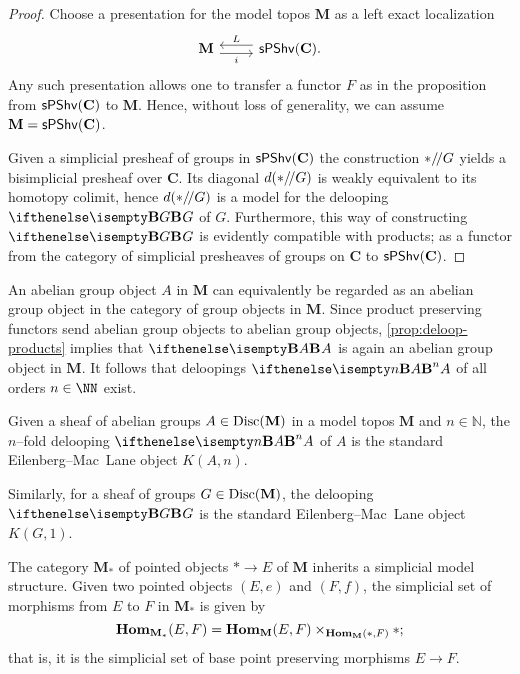 \begin{proof}
  Choose a presentation for the model topos \(\mathbf M\) as a left exact
  localization
  \[
    \begin{tikzcd}
      \mathbf M \arrow[r, shift right=.7ex, "i"'] & \arrow[l, shift right=.7ex,
      "L"'] \spshv(\mathbf C).
    \end{tikzcd}
  \]
  Any such presentation allows one to transfer a functor \(F\) as in the
  proposition from \(\operatorname{\textnormal{\textsf{sPShv}}}(\mathbf C)\) to \(\mathbf M\). Hence, without loss
  of generality, we can assume \(\mathbf M = \operatorname{\textnormal{\textsf{sPShv}}}(\mathbf C)\).

  Given a simplicial presheaf of groups in \(\operatorname{\textnormal{\textsf{sPShv}}}(\mathbf C)\) the
  construction \(*/\!/G\) yields a bisimplicial presheaf over \(\mathbf
  C\). Its diagonal \(d(*/\!/G)\) is weakly equivalent to its homotopy
  colimit, hence \(d(*/\!/G)\) is a model
  for the delooping \(\deloop{G}\) of \(G\). Furthermore, this way of
  constructing \(\deloop{G}\) is evidently compatible with products; as a functor from the category of simplicial presheaves
  of groups on \(\mathbf C\) to \(\operatorname{\textnormal{\textsf{sPShv}}}(\mathbf C)\).
\end{proof}

An abelian group object \(A\) in \(\mathbf M\) can equivalently be regarded as
an abelian group object in the category of group objects in \(\mathbf M\). Since
product preserving functors send abelian group objects to abelian group objects,
\autoref{prop:deloop-products} implies that \(\deloop{A}\) is again an abelian
group object in \(\mathbf M\). It follows that deloopings \(\deloop[n]{A}\) of
all orders \(n\in\NN\) exist.

\begin{definition}
  Given a sheaf of abelian groups \(A\in\operatorname{\textnormal{Disc}}(\mathbf M)\) in a model topos
  \(\mathbf M\) and \(n\in\mathbb N\), the \(n\)--fold delooping
  \(\deloop[n]{A}\) of \(A\) is the standard Eilenberg--Mac~Lane object
  \(K(A,n)\).

  Similarly, for a sheaf of groups \(G\in\operatorname{\textnormal{Disc}}(\mathbf M)\), the delooping
  \(\deloop{G}\) is the standard Eilenberg--Mac~Lane object \(K(G,1)\).
\end{definition}

The category \(\mathbf M_*\) of pointed objects \(*\to E\) of \(\mathbf M\)
inherits a simplicial model structure. Given two pointed objects \((E,e)\) and
\((F,f)\), the simplicial set of morphisms from \(E\) to \(F\) in \(\mathbf
M_*\) is given by
\[
  \operatorname{\textnormal{\bfseries Hom}}_{\mathbf M_*}(E,F) = \operatorname{\textnormal{\bfseries Hom}}_{\mathbf M}(E,F) \times_{\operatorname{\textnormal{\bfseries Hom}}_{\mathbf M}(*,
    F)} *;
\]
that is, it is the simplicial set of base point preserving morphisms \(E\to F\).

